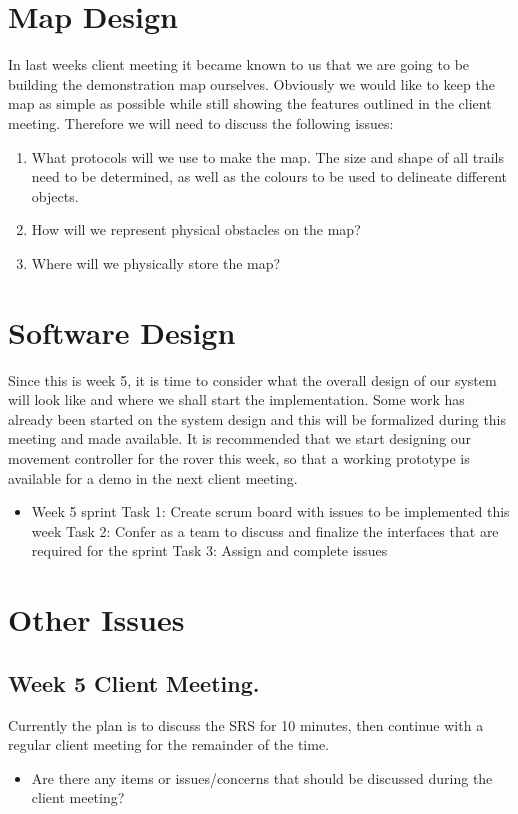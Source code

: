 \documentclass[11pt, a4paper]{article}
\begin{document}
\begin{flushleft}
  \section{Map Design}
  	In last weeks client meeting it became known to us that we are going to be building the demonstration map ourselves. Obviously we would like to keep the map as simple as possible while still showing the features outlined in the client meeting.  Therefore we will need to discuss the following issues:
	\begin{enumerate}
    \item What protocols will we use to make the map. The size and shape of all trails need to be determined, as well as the colours to be used to delineate different objects.
    \item How will we represent physical obstacles on the map?
    \item Where will we physically store the map?
	\end{enumerate}
    
  \section{Software Design}
  Since this is week 5, it is time to consider what the overall design of our system will look like and where we shall start the implementation. Some work has already been started on the system design and this will be formalized during this meeting and made available. It is recommended that we start designing our movement controller for the rover this week, so that a working prototype is available for a demo in the next client meeting.
   \begin{itemize}
  \item Week 5 sprint
  \linebreak Task 1: Create scrum board with issues to be implemented this week
  \linebreak Task 2: Confer as a team to discuss and finalize the interfaces that are required for the sprint
  \linebreak Task 3: Assign and complete issues
  \end{itemize}
  
  \section{Other Issues}
  \subsection{Week 5 Client Meeting.}
  Currently the plan is to discuss the SRS for 10 minutes, then continue with a regular client meeting for the remainder of the time. 
  \begin{itemize}
  \item Are there any items or issues/concerns that should be discussed during the client meeting?
  \end{itemize}

\end{flushleft}
\end{document}
